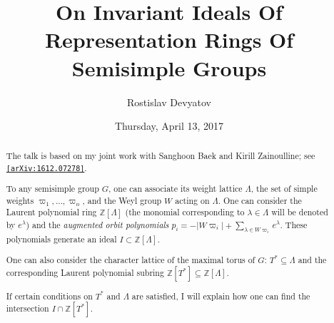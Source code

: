 \documentclass{UAmathtalk}
\author{Rostislav Devyatov}
\title{On Invariant Ideals Of Representation Rings Of Semisimple Groups}
\date{Thursday, April 13, 2017}
\begin{document}
\maketitle

\begin{abstract}
The talk is based on my joint work with Sanghoon Baek and Kirill Zainoulline; see \href{https://arxiv.org/abs/1612.07278/}{\texttt{[arXiv:1612.07278]}}.

To any semisimple group $G$, one can associate its weight lattice $\Lambda$, the set of simple weights $\varpi_1,\ldots,\varpi_n$, and the Weyl group $W$ acting on $\Lambda$. One can consider the Laurent polynomial ring $\mathbb{Z}[\Lambda]$ (the monomial corresponding to $\lambda\in\Lambda$ will be denoted by $e^{\lambda}$) and the \emph{augmented orbit polynomials} $p_i=-|W\varpi_i|+\sum_{\lambda\in W\varpi_i}e^{\lambda}$. These polynomials generate an ideal $I\subset\mathbb{Z}[\Lambda]$.

One can also consider the character lattice of the maximal torus of $G$: $T^*\subseteq\Lambda$ and the corresponding Laurent polynomial subring $\mathbb{Z}[T^*]\subseteq\mathbb{Z}[\Lambda]$.

If certain conditions on $T^*$ and $\Lambda$ are satisfied, I will explain how one can find the intersection $I\cap\mathbb{Z}[T^*]$.
\end{abstract}
\end{document}
